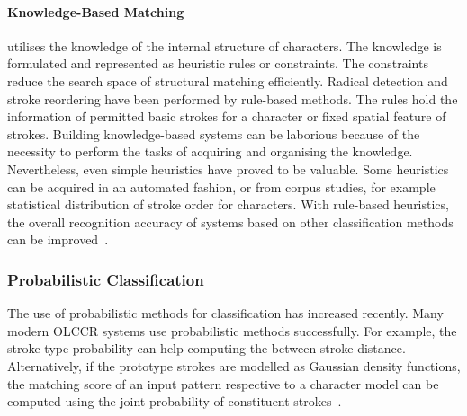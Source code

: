 \paragraph{Knowledge-Based Matching} utilises the knowledge of the internal 
structure of characters. The knowledge is formulated and represented as heuristic
rules or constraints. The constraints reduce the search space of structural 
matching efficiently. Radical detection and stroke reordering have been performed
by rule-based methods. The rules hold the information of permitted basic strokes
for a character or fixed spatial feature of strokes.
Building knowledge-based systems can be laborious because of the necessity to
perform the tasks of acquiring and organising the knowledge. 
Nevertheless, even simple heuristics have proved to be valuable. 
Some heuristics can be acquired in an automated fashion,
or from corpus studies, for example statistical distribution of stroke order for
characters. With rule-based heuristics, the overall recognition accuracy of
systems based on other classification methods can be 
improved~.

\subsubsection{Probabilistic Classification}
\label{sec:olccr:probabilisticclassification}

The use of probabilistic methods for classification has increased recently. Many modern 
OLCCR systems use probabilistic methods successfully. For example, the stroke-type
probability can help computing the between-stroke distance. Alternatively,
if the prototype strokes are modelled as Gaussian density functions, the 
matching score of an input pattern respective to a character model can be 
computed using the joint probability of constituent 
strokes~.

